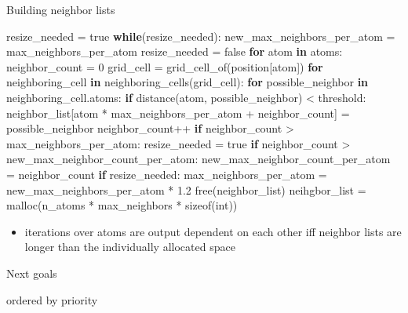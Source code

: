 \documentclass[ignorenonframetext,]{beamer}
\newenvironment{Shaded}{}{}
\newcommand{\BuiltInTok}[1]{#1}
\newcommand{\ControlFlowTok}[1]{\textcolor[rgb]{0.00,0.44,0.13}{\textbf{#1}}}
\newcommand{\DecValTok}[1]{\textcolor[rgb]{0.25,0.63,0.44}{#1}}
\newcommand{\FloatTok}[1]{\textcolor[rgb]{0.25,0.63,0.44}{#1}}
\newcommand{\KeywordTok}[1]{\textcolor[rgb]{0.00,0.44,0.13}{\textbf{#1}}}
\newcommand{\NormalTok}[1]{#1}
\newcommand{\OperatorTok}[1]{\textcolor[rgb]{0.40,0.40,0.40}{#1}}
\providecommand{\tightlist}{%
  \setlength{\itemsep}{0pt}\setlength{\parskip}{0pt}}
\begin{document}
\begin{frame}[fragile]
\begin{block}{Building neighbor lists}
\begin{Shaded}
\begin{Highlighting}[]
\NormalTok{  resize_needed }\OperatorTok{=}\NormalTok{ true}
  \ControlFlowTok{while}\NormalTok{(resize_needed):}
\NormalTok{    new_max_neighbors_per_atom }\OperatorTok{=}\NormalTok{ max_neighbors_per_atom}
\NormalTok{    resize_needed }\OperatorTok{=}\NormalTok{ false}
    \ControlFlowTok{for}\NormalTok{ atom }\KeywordTok{in}\NormalTok{ atoms:}
\NormalTok{      neighbor_count }\OperatorTok{=} \DecValTok{0}
\NormalTok{      grid_cell }\OperatorTok{=}\NormalTok{ grid_cell_of(position[atom])}
      \ControlFlowTok{for}\NormalTok{ neighboring_cell }\KeywordTok{in}\NormalTok{ neighboring_cells(grid_cell):}
        \ControlFlowTok{for}\NormalTok{ possible_neighbor }\KeywordTok{in}\NormalTok{ neighboring_cell.atoms:}
          \ControlFlowTok{if}\NormalTok{ distance(atom, possible_neighbor) }\OperatorTok{<}\NormalTok{ threshold:}
\NormalTok{            neighbor_list[atom }\OperatorTok{*}\NormalTok{ max_neighbors_per_atom }\OperatorTok{+}\NormalTok{ neighbor_count] }\OperatorTok{=}\NormalTok{ possible_neighbor}
\NormalTok{            neighbor_count}\OperatorTok{++}
      \ControlFlowTok{if}\NormalTok{ neighbor_count }\OperatorTok{>}\NormalTok{ max_neighbors_per_atom:}
\NormalTok{        resize_needed }\OperatorTok{=}\NormalTok{ true}
        \ControlFlowTok{if}\NormalTok{ neighbor_count }\OperatorTok{>}\NormalTok{ new_max_neighbor_count_per_atom:}
\NormalTok{          new_max_neighbor_count_per_atom }\OperatorTok{=}\NormalTok{ neighbor_count}
    \ControlFlowTok{if}\NormalTok{ resize_needed:}
\NormalTok{      max_neighbors_per_atom }\OperatorTok{=}\NormalTok{ new_max_neighbors_per_atom }\OperatorTok{*} \FloatTok{1.2}
\NormalTok{      free(neighbor_list)}
\NormalTok{      neihgbor_list }\OperatorTok{=}\NormalTok{ malloc(n_atoms }\OperatorTok{*}\NormalTok{ max_neighbors }\OperatorTok{*}\NormalTok{ sizeof(}\BuiltInTok{int}\NormalTok{))}
\end{Highlighting}
\end{Shaded}

\begin{itemize}
\tightlist
\item
  iterations over atoms are output dependent on each other iff neighbor
  lists are longer than the individually allocated space
\end{itemize}

\end{block}

\begin{block}{Next goals}

ordered by priority


\end{block}
\end{frame}
\end{document}
